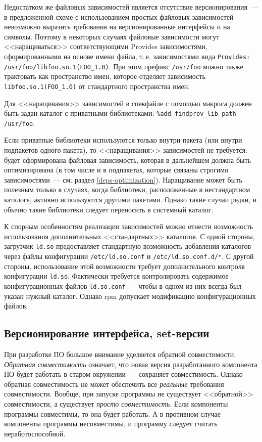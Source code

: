 \documentclass[russian,a4paper,12pt,titlepage]{article}
\begin{document}
Недостатком же файловых зависимостей является отсутствие версионирования~--- в предложенной схеме
с использованием простых файловых зависимостей невозможно выразить требования на версионированные
интерфейсы и на символы.  Поэтому в некоторых случаях файловые зависимости могут <<наращиваться>>
соответствующими Provides зависимостями, сформированными на основе имени файла, т.\,е. зависимостями
вида \texttt{Provides: /usr/foo/libfoo.so.1(FOO\_1.0)}.  При этом префикс \verb|/usr/foo| можно также
трактовать как пространство имен, которое отделяет зависимость \verb|libfoo.so.1(FOO_1.0)| от стандартного
пространства имен.

Для <<наращивания>> зависимостей в спекфайле с помощью макроса должен быть задан каталог
с приватными библиотеками: \verb|%add_findprov_lib_path /usr/foo|.

Если приватные библиотеки используются только внутри пакета (или внутри подпакетов одного пакета),
то <<наращивания>> зависимостей не требуется: будет сформирована файловая зависимость, которая в дальнейшем должна
быть оптимизирована (в том числе и в подпакетах, которые связаны строгими зависимостями~--- см. раздел \ref{deps-optimization}).
Наращивание может быть полезным только в случаях, когда библиотеки, расположенные в нестандартном каталоге, активно используются
другими пакетами.  Однако такие случаи редки, и обычно такие библиотеки следует переносить в системный каталог.

К спорным особенностям реализации зависимостей можно отнести возможность использования дополнительных <<стандартных>> каталогов.
С одной стороны, загрузчик \verb|ld.so| предоставляет стандартную возможность добавления каталогов
через файлы конфигурации \verb|/etc/ld.so.conf| и \verb|/etc/ld.so.conf.d/*|.  С другой стороны, использование этой возможности
требует дополнительного контроля конфигурации \verb|ld.so|.  Фактически требуется контролировать содержимое конфигурационных
файлов \verb|ld.so.conf|~--- чтобы в одном из них всегда был указан нужный каталог.  Однако rpm допускает модификацию
конфигурационных файлов.

\subsection{Версионирование интерфейса, set-версии}
\label{set-versions}
При разработке ПО большое внимание уделяется обратной совместимости.  \emph{Обратная совместимость}
означает, что новая версия разработанного компонента ПО будет работать в старом окружении~--- сохраняет совместимость.
Однако обратная совместимость не может обеспечить все \emph{реальные} требования совместимости.  Вообще,
при запуске программы не существует <<обратной>> совместимости, а существует \emph{просто совместимость}.
Если компоненты программы совместимы, то она будет работать.  А в противном случае компоненты программы несовместимы,
и программу следует считать неработоспособной.
\end{document}

